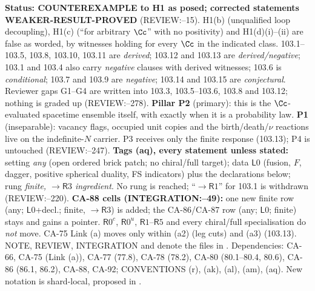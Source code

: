 \textbf{Status: COUNTEREXAMPLE to H1 as posed; corrected statements WEAKER-RESULT-PROVED} (REVIEW:--15).
H1(b) (unqualified loop decoupling), H1(c) (``for arbitrary \(\Cc\)'' with no positivity) and H1(d)(i)--(ii) are false
as worded, by witnesses holding for every \(\Cc\) in the indicated class. 103.1--103.5, 103.8, 103.10, 103.11 are
\emph{derived}; 103.12 and 103.13 are \emph{derived/negative}; 103.1 and 103.4 also carry \emph{negative} clauses with derived witnesses; 103.6 is \emph{conditional};
103.7 and 103.9 are \emph{negative}; 103.14 and 103.15 are \emph{conjectural}. Reviewer gaps G1--G4 are written into
103.3, 103.5--103.6, 103.8 and 103.12; nothing is graded up (REVIEW:--278).
\textbf{Pillar P2} (primary): this is the \(\Cc\)-evaluated spacetime ensemble itself, with exactly when it is a probability
law. \textbf{P1} (inseparable): vacancy flags, occupied unit copies and the birth/death/\(\nu\) reactions live on the
indefinite-\(N\) carrier. P3 receives only the finite response (103.13); P4 is untouched (REVIEW:--247).
\textbf{Tags (aq), every statement unless stated:} setting \emph{any} (open ordered brick patch; no chiral/full target);
data \(\mathsf L0\) (fusion, \(F\), dagger, positive spherical duality, FS indicators) plus the declarations below;
rung \emph{finite, \(\to\mathsf R3\) ingredient}. No rung is reached; ``\(\to\mathsf R1\)'' for 103.1 is withdrawn (REVIEW:--220).
\textbf{CA-88 cells (INTEGRATION:--49):} one new finite row (any; \(\mathsf L0\)+decl.; finite, \(\to\mathsf R3\)) is added;
the CA-86/CA-87 row (any; \(\mathsf L0\); finite) stays and gains a pointer. \(\mathsf R0^c\), \(\mathsf R0^u\), \(\mathsf R1\)--\(\mathsf R5\) and every
chiral/full specialisation do \emph{not} move. CA-75 Link (a) moves only within (a2) (leg cuts) and (a3) (103.13).
NOTE, REVIEW, INTEGRATION and  denote the files in .
Dependencies: CA-66, CA-75 (Link (a)), CA-77 (77.8), CA-78 (78.2), CA-80 (80.1--80.4, 80.6), CA-86 (86.1, 86.2), CA-88, CA-92;
CONVENTIONS (r), (ak), (al), (am), (aq). New notation is shard-local, proposed in .

